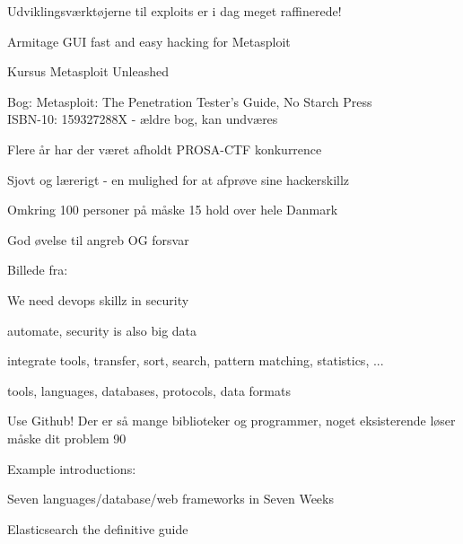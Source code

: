 \documentclass[20pt,landscape,a4paper,footrule]{foils}
\begin{document}
\begin{list1}
\item Udviklingsværktøjerne til exploits er i dag meget raffinerede!
\item {}
\item Armitage GUI fast and easy hacking for Metasploit\\
\item Kursus Metasploit Unleashed\\
\item Bog: Metasploit: The Penetration Tester's Guide, No Starch Press\\
ISBN-10: 159327288X - ældre bog, kan undværes
\end{list1}





\begin{list1}
\item Flere år har der været afholdt PROSA-CTF konkurrence
\item Sjovt og lærerigt - en mulighed for at afprøve sine hackerskillz
\item Omkring 100 personer på måske 15 hold over hele Danmark
\item God øvelse til angreb OG forsvar
\end{list1}

Billede fra: 



\begin{list1}
\item We need devops skillz in security
\item automate, security is also big data
\item integrate tools, transfer, sort, search, pattern matching, statistics, ...
\item tools, languages, databases, protocols, data formats
\item Use Github! Der er så mange biblioteker og programmer, noget eksisterende løser måske dit problem 90%
\item Example introductions:
\begin{list2}
\item Seven languages/database/web frameworks in Seven Weeks
\item Elasticsearch the definitive guide
\end{list2}
\end{list1}
\end{document}
